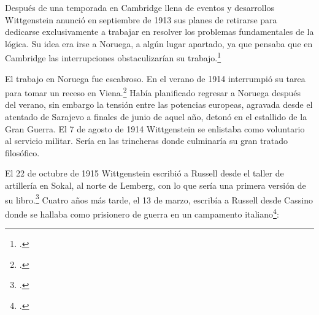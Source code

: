 Después de una temporada en Cambridge llena de eventos y desarrollos
Wittgenstein anunció en septiembre de 1913 sus planes de retirarse para
dedicarse exclusivamente a trabajar en resolver los problemas fundamentales de
la lógica. Su idea era irse a Noruega, a algún lugar apartado, ya que pensaba
que en Cambridge las interrupciones obstaculizarían su trabajo.\footcite[cap. 4
loc 1844]{monk} 

El trabajo en Noruega fue escabroso. En el verano de 1914 interrumpió su tarea
para tomar un receso en Viena.\footcite[cap. 5 loc 2154]{monk} Había planificado
regresar a Noruega después del verano, sin embargo la tensión entre las
potencias europeas, agravada desde el atentado de Sarajevo a finales de junio de
aquel año, detonó en el estallido de la Gran Guerra. El 7 de agosto de 1914
Wittgenstein se enlistaba como voluntario al servicio militar. Sería en las
trincheras donde culminaría su gran tratado filosófico.

El 22 de octubre de 1915 Wittgenstein escribió a Russell desde el taller de
artillería en Sokal, al norte de Lemberg, con lo que sería una primera versión
de su libro.\footcite[cf. p.84]{cambridgeletters} Cuatro años más tarde, el 13
de marzo, escribía a Russell desde Cassino donde se hallaba como prisionero de
guerra en un campamento italiano\footcite[cf. p.268]{mcguinness}: 

